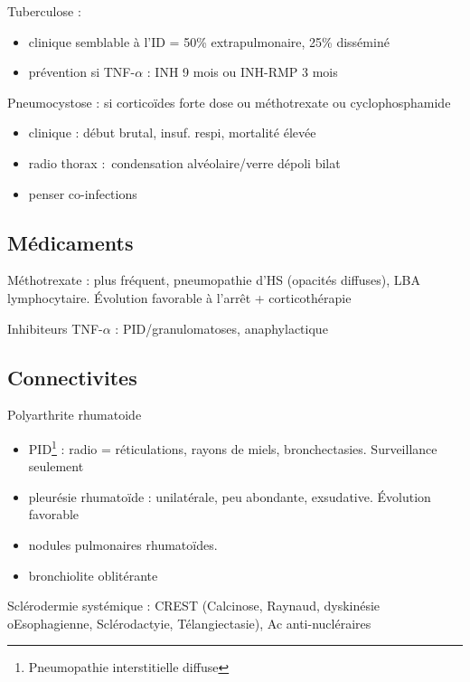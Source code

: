 \documentclass{book}
\begin{document}
Tuberculose : 

\begin{itemize}
\item clinique semblable à l'ID = 50\% extrapulmonaire, 25\% disséminé
\item prévention si TNF-\(\alpha\) : INH 9 mois ou INH-RMP 3 mois
\end{itemize}

Pneumocystose : si corticoïdes forte dose ou méthotrexate ou
cyclophosphamide

\begin{itemize}
\item clinique : début brutal, insuf. respi, mortalité élevée
\item radio thorax : condensation alvéolaire/verre dépoli bilat
\item penser co-infections
\end{itemize}

\subsection{Médicaments}
\label{sec:orgdf9e730}
Méthotrexate : plus fréquent, pneumopathie d'HS (opacités diffuses), \gls{LBA}
lymphocytaire. Évolution favorable à l'arrêt + corticothérapie

Inhibiteurs TNF-\(\alpha\) : PID/granulomatoses, anaphylactique

\subsection{Connectivites}
\label{sec:org5353e0f}
Polyarthrite rhumatoide

\begin{itemize}
\item PID\footnote{Pneumopathie interstitielle diffuse} : radio =
réticulations, rayons de miels, bronchectasies. Surveillance seulement
\item pleurésie rhumatoïde : unilatérale, peu abondante, exsudative. Évolution
favorable
\item nodules pulmonaires rhumatoïdes.
\item bronchiolite oblitérante
\end{itemize}

Sclérodermie systémique : CREST (Calcinose, Raynaud, dyskinésie oEsophagienne,
Sclérodactyie, Télangiectasie), Ac anti-nucléraires

\end{document}
